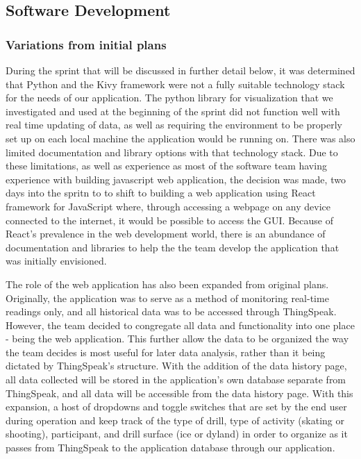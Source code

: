 \subsection{Software Development}
\subsubsection{Variations from initial plans}
During the sprint that will be discussed in further detail below, it was determined that Python and the Kivy framework were not a fully suitable technology stack for the needs of our application. The python library for visualization that we investigated and used at the beginning of the sprint did not function well with real time updating of data, as well as requiring the environment to be properly set up on each local machine the application would be running on. There was also limited documentation and library options with that technology stack. Due to these limitations, as well as experience as most of the software team having experience with building javascript web application, the decision was made, two days into the spritn to  to shift to building a web application using React framework for JavaScript where, through accessing a webpage on any device connected to the internet, it would be possible to access the GUI. Because of React's prevalence in the web development world, there is an abundance of documentation and libraries to help the the team develop the application that was initially envisioned. 

The role of the web application has also been expanded from original plans. Originally, the application was to serve as a method of monitoring real-time readings only, and all historical data was to be accessed through ThingSpeak. However, the team decided to congregate all data and functionality into one place - being the web application. This further allow the data to be organized the way the team decides is most useful for later data analysis, rather than it being dictated by ThingSpeak's structure. With the addition of the data history page, all data collected will be stored in the application's own database separate from ThingSpeak, and all data will be accessible from the data history page. With this expansion, a host of dropdowns and toggle switches that are set by the end user during operation and keep track of the type of drill, type of activity (skating or shooting), participant, and drill surface (ice or dyland) in order to organize as it passes from ThingSpeak to the application database through our application. 

